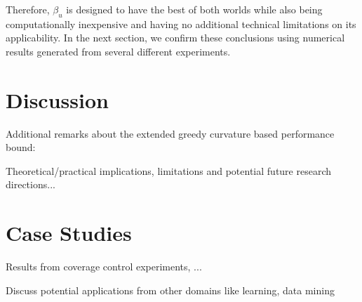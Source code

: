 \documentclass[letterpaper, 10 pt, conference]{ieeeconf}
\newcommand{\R}{\mathbb{R}}
\begin{document}
{Therefore, $\beta_u$ is designed to have the best of both worlds while also being computationally inexpensive and having no additional technical limitations on its applicability. In the next section, we confirm these conclusions using numerical results generated from several different experiments. 

}




\section{Discussion}\label{Sec:Discussion}

Additional remarks about the extended greedy curvature based performance bound: 

Theoretical/practical implications, limitations and potential future research directions...


\section{Case Studies}
\label{Sec:CaseStudies}

Results from coverage control experiments, ...

Discuss potential applications from other domains like learning, data mining 


\end{document}

